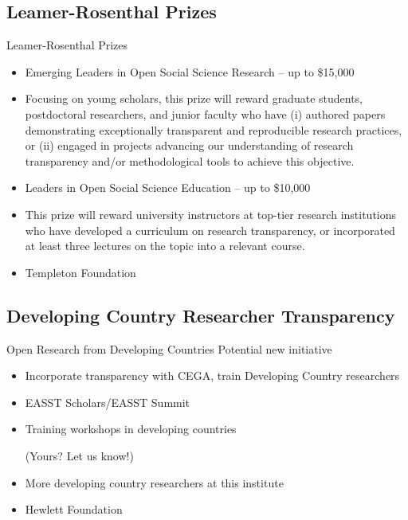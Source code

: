 \documentclass{beamer}
\begin{document}
\subsection{Leamer-Rosenthal Prizes}
\begin{frame}{Leamer-Rosenthal Prizes}

\begin{itemize}
\item Emerging Leaders in Open Social Science Research – up to \$15,000
\href{http://www.bitss.org/prizes}{}

\item 
Focusing on young scholars, this prize will reward graduate students, postdoctoral researchers, and junior faculty who have (i) authored papers demonstrating exceptionally transparent and reproducible research practices, or (ii) engaged in projects advancing our understanding of research transparency and/or methodological tools to achieve this objective.

\item Leaders in Open Social Science Education – up to \$10,000

\item This prize will reward university instructors at top-tier research institutions who have developed a curriculum on research transparency, or incorporated at least three lectures on the topic into a relevant course. 

\item Templeton Foundation
\end{itemize}
\end{frame}

\subsection{Developing Country Researcher Transparency}
\begin{frame}{Open Research from Developing Countries}
Potential new initiative
\begin{itemize}
\item Incorporate transparency with CEGA, train Developing Country researchers
\item EASST Scholars/EASST Summit
\item Training workshops in developing countries 

(Yours?  Let us know!)
\item More developing country researchers at this institute
\item Hewlett Foundation
\end{itemize}


\end{frame}
\end{document}
